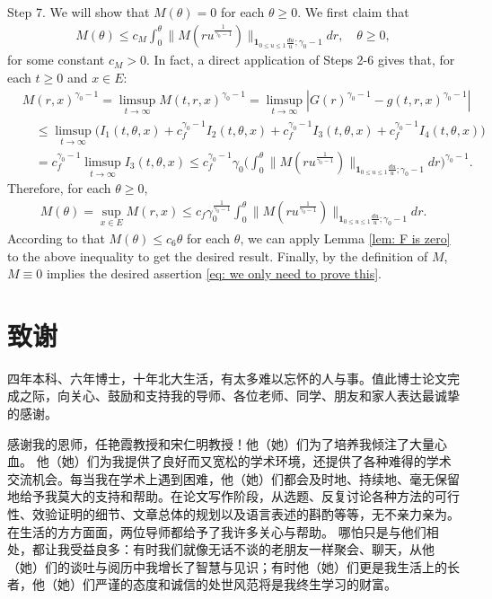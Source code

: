 \documentclass[UTF8]{pkuthss}
\theoremstyle{plain}
\theoremstyle{definition}
\numberwithin{equation}{section}
\begin{document}
	Step 7. We will show that $M(\theta) = 0$ for each $\theta \geq 0$.
	We first claim that
\begin{align}
	M(\theta)
	\leq c_M\int_0^\theta  \big\| M(r u^{\frac{1}{\gamma_0 - 1}}) \big\|_{\mathbf 1_{0\leq u\leq 1}\frac{du}{u};\gamma_0 - 1}  dr ,
	\quad \theta \geq 0,
\end{align}
	for some constant $c_M > 0$.
	In fact, a direct application of Steps 2-6 gives that, for each $t\geq 0$ and $x\in E$:
\begin{align}
	&M(r,x)^{\gamma_0 - 1}
	=\limsup_{t\to \infty} M(t,r,x)^{\gamma_0 - 1}
	= \limsup_{t\to \infty}|G(r)^{\gamma_0 - 1} - g(t,r,x)^{\gamma_0 - 1}|
	\\&\quad \leq \limsup_{t\to \infty} \big( I_1(t,\theta,x) +c^{\gamma_0 - 1}_f I_2(t,\theta,x) +c^{\gamma_0 - 1}_f I_3(t,\theta,x) + c^{\gamma_0 - 1}_f I_4(t,\theta,x) \big)
	\\& \quad = c_f^{\gamma_0 - 1} \limsup_{t\to \infty} I_3(t,\theta ,x)
	\leq c_f^{\gamma_0 - 1} \gamma_0 \Big(  \int_0^\theta  \big\| M(r u^{\frac{1}{\gamma_0 - 1}}) \big\|_{\mathbf 1_{0\leq u\leq 1}\frac{du}{u};\gamma_0 - 1}  dr\Big)^{\gamma_0 - 1}.
\end{align}
	Therefore, for each $\theta \geq 0$,
\begin{align}
	M(\theta)
	= \sup_{x\in E}  M(r,x)
	\leq c_f \gamma_0^{\frac{1}{\gamma_0 - 1}} \int_0^\theta  \big\| M(r u^{\frac{1}{\gamma_0 - 1}}) \big\|_{\mathbf 1_{0\leq u\leq 1}\frac{du}{u};\gamma_0 - 1}  dr.
\end{align}
	According to that $M(\theta) \leq c_6 \theta$ for each $\theta$, we can apply Lemma \ref{lem: F is zero} to the above inequality to get the desired result.
	Finally, by the definition of $M$,  $M\equiv 0$ implies the desired assertion \eqref{eq: we only need to prove this}.

\printbibliography[heading = bibintoc]
\backmatter
\chapter{致谢}	
	四年本科、六年博士，十年北大生活，有太多难以忘怀的人与事。值此博士论文完成之际，向关心、鼓励和支持我的导师、各位老师、同学、朋友和家人表达最诚挚的感谢。

	感谢我的恩师，任艳霞教授和宋仁明教授！他（她）们为了培养我倾注了大量心血。
	他（她）们为我提供了良好而又宽松的学术环境，还提供了各种难得的学术交流机会。每当我在学术上遇到困难，他（她）们都会及时地、持续地、毫无保留地给予我莫大的支持和帮助。在论文写作阶段，从选题、反复讨论各种方法的可行性、效验证明的细节、文章总体的规划以及语言表述的斟酌等等，无不亲力亲为。
	在生活的方方面面，两位导师都给予了我许多关心与帮助。
	哪怕只是与他们相处，都让我受益良多：有时我们就像无话不谈的老朋友一样聚会、聊天，从他（她）们的谈吐与阅历中我增长了智慧与见识；有时他（她）们更是我生活上的长者，他（她）们严谨的态度和诚信的处世风范将是我终生学习的财富。
\end{document}
